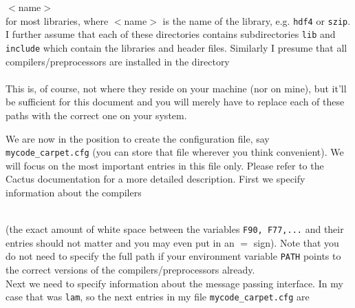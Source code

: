 \documentclass[11pt]{article}
\numberwithin{equation}{section}
\begin{document}
\hspace{1cm}{\tt /usr/local/}$<$name$>$\\

for most libraries,
where $<$name$>$ is the name of the library, e.g. {\tt hdf4} or {\tt szip}.
I further assume that each of these directories contains subdirectories
{\tt lib} and {\tt include} which contain the libraries and header files.
Similarly I presume that all compilers/preprocessors are installed in the
directory\\

\hspace{1cm}{\tt /usr/local/for\_carpet/bin}\\

This is, of course, not where they reside on your machine
(nor on mine), but it'll be sufficient for this document and
you will merely have to replace each of these paths with the correct one
on your system.

We are now in the position to create the configuration file, say
{\tt mycode\_carpet.cfg} (you can store that file wherever you think
convenient). We will focus on the most important entries
in this file only. Please refer to the Cactus documentation
for a more detailed description. First we specify information
about the compilers\\






\\


(the exact amount of white space between the variables {\tt F90, F77,...} and
their entries should not matter and you may even put in an $=$ sign).
Note that you do not need to specify the
full path if your environment variable {\tt PATH} points to the correct
versions of the compilers/preprocessors already.\\
Next we need to specify information about the message passing interface.
In my case that was {\tt lam}, so the next entries in my
file {\tt mycode\_carpet.cfg} are\\
\end{document}
